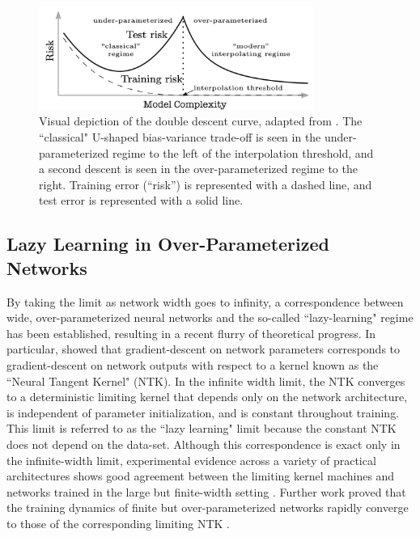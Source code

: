 \documentclass[11pt]{article}
\begin{document}
\begin{figure}[ht]
\centering
\captionsetup{width=.8\linewidth}
\includegraphics[width=0.8\textwidth]{docs/assets/double_descent_reconciling.png}
\caption{Visual depiction of the double descent curve, adapted from \cite{belkinReconcilingModernMachine2019}. The ``classical" U-shaped bias-variance trade-off is seen in the under-parameterized regime to the left of the interpolation threshold, and a second descent is seen in the over-parameterized regime to the right. Training error (``risk'') is represented with a dashed line, and test error is represented with a solid line.}
\label{doubledescent}
\end{figure}

\subsection{Lazy Learning in Over-Parameterized Networks}

By taking the limit as network width goes to infinity, a correspondence between wide, over-parameterized neural networks and the so-called ``lazy-learning" regime has been established, resulting in a recent flurry of theoretical progress. In particular, \cite{jacotNeuralTangentKernel2018} showed that gradient-descent on network parameters corresponds to gradient-descent on network outputs with respect to a kernel known as the ``Neural Tangent Kernel" (NTK). In the infinite width limit, the NTK converges to a deterministic limiting kernel that depends only on the network architecture, is independent of parameter initialization, and is constant throughout training. This limit is referred to as the ``lazy learning" limit because the constant NTK does not depend on the data-set. Although this correspondence is exact only in the infinite-width limit, experimental evidence across a variety of practical architectures shows good agreement between the limiting kernel machines and networks trained in the large but finite-width setting \cite{jacotNeuralTangentKernel2018}. Further work proved that the training dynamics of finite but over-parameterized networks rapidly converge to those of the corresponding limiting NTK \cite{allen-zhuConvergenceTheoryDeep2019}.\\
\end{document}
